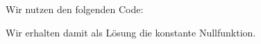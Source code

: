 \section{}

Wir nutzen den folgenden Code:



Wir erhalten damit als Lösung die konstante Nullfunktion.

